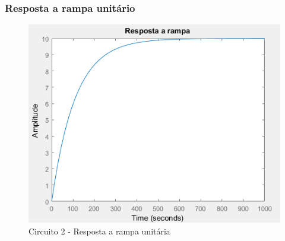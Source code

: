 \documentclass[a4paper, 12pt]{article}
\begin{document}
			\subsubsection{Resposta a rampa unitário}
			\begin{figure}[!ht]
				\centering
				\includegraphics[scale=0.72]{img/1h_circ2.png}
				\caption{Circuito 2 - Resposta a rampa unitária}
			\end{figure}
\end{document}
